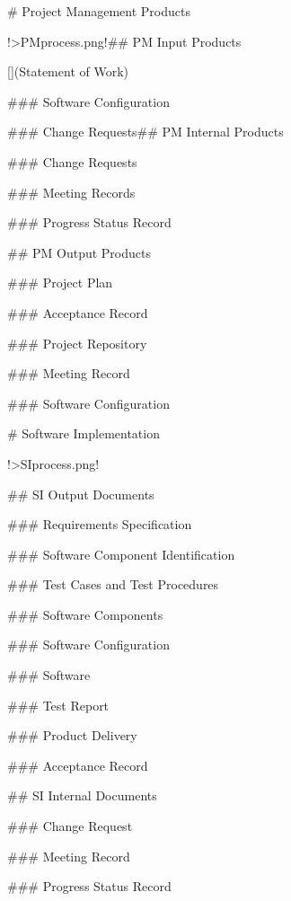 # Project Management Products

!>PMprocess.png!\n\n## PM Input Products

[](Statement of Work)

### Software Configuration

### Change Requests\n\n## PM Internal Products

### Change Requests

### Meeting Records

### Progress Status Record

## PM Output Products

### Project Plan

### Acceptance Record 

### Project Repository

### Meeting Record 

### Software Configuration

# Software Implementation

!>SIprocess.png!

## SI Output Documents

### Requirements Specification 

### Software Component Identification 

### Test Cases and Test Procedures 

### Software Components

### Software Configuration 

### Software 

### Test Report

### Product Delivery

### Acceptance Record 

## SI Internal Documents

### Change Request 

### Meeting Record 

### Progress Status Record
